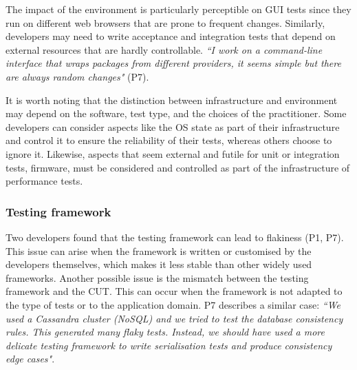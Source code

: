 The impact of the environment is particularly perceptible on GUI tests since they run on different web browsers that are prone to frequent changes.
Similarly, developers may need to write acceptance and integration tests that depend on external resources that are hardly controllable.
\textit{``I work on a command-line interface that wraps packages from different providers, it seems simple but there are always random changes"} (P7).

It is worth noting that the distinction between infrastructure and environment may depend on the software, test type, and the choices of the practitioner.
Some developers can consider aspects like the OS state as part of their infrastructure and control it to ensure the reliability of their tests, whereas others choose to ignore it.
Likewise, aspects that seem external and futile for unit or integration tests, \eg firmware, must be considered and controlled as part of the infrastructure of performance tests.

\subsubsection{\textbf{Testing framework}}
Two developers found that the testing framework can lead to flakiness (P1, P7).
This issue can arise when the framework is written or customised by the developers themselves, which makes it less stable than other widely used frameworks.
Another possible issue is the mismatch between the testing framework and the CUT.
This can occur when the framework is not adapted to the type of tests or to the application domain.
P7 describes a similar case: \textit{``We used a Cassandra cluster (NoSQL) and we tried to test the database consistency rules. This generated many flaky tests. Instead, we should have used a more delicate testing framework to write serialisation tests and produce consistency edge cases"}.


